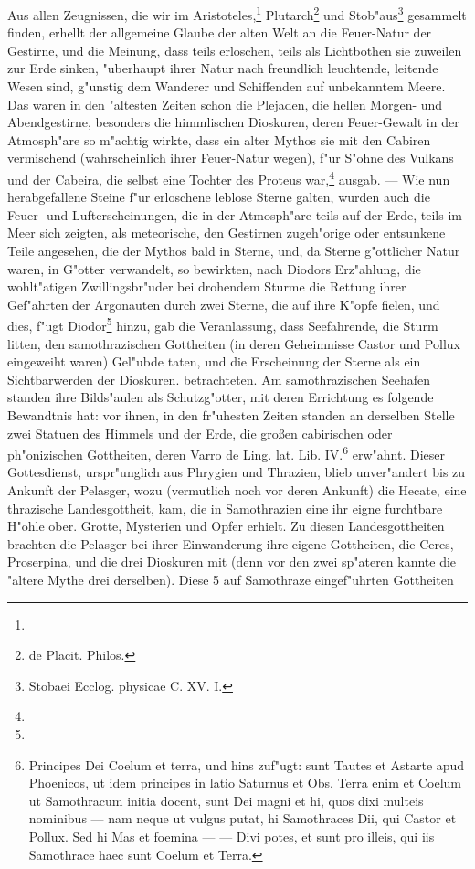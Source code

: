 \documentclass[a4paper, 11pt, oneside, polutonikogreek, german]{article}
\begin{document}
Aus allen Zeugnissen, die wir im Aristoteles,\footnote{} Plutarch\footnote{de Placit. Philos.} und Stob"aus\footnote{Stobaei Ecclog. physicae C. XV. I.} gesammelt finden, erhellt der allgemeine Glaube der alten Welt an die Feuer-Natur der Gestirne, und die Meinung, dass teils erloschen, teils als Lichtbothen sie zuweilen zur Erde sinken, "uberhaupt ihrer Natur nach freundlich leuchtende, leitende Wesen sind, g"unstig dem Wanderer und Schiffenden auf unbekanntem Meere. Das waren in den "altesten Zeiten schon die Plejaden, die hellen Morgen- und Abendgestirne, besonders die himmlischen Dioskuren, deren Feuer-Gewalt in der Atmosph"are so m"achtig wirkte, dass ein alter Mythos sie mit den Cabiren vermischend (wahrscheinlich ihrer Feuer-Natur wegen), f"ur S"ohne des Vulkans und der Cabeira, die selbst eine Tochter des Proteus war,\footnote{} ausgab. --- Wie nun herabgefallene Steine f"ur erloschene leblose Sterne galten, wurden auch die Feuer- und Lufterscheinungen, die in der Atmosph"are teils auf der Erde, teils im Meer sich zeigten, als meteorische, den Gestirnen zugeh"orige oder entsunkene Teile angesehen, die der Mythos bald in Sterne, und, da Sterne g"ottlicher Natur waren, in G"otter verwandelt, so bewirkten, nach Diodors Erz"ahlung, die wohlt"atigen Zwillingsbr"uder bei drohendem Sturme die Rettung ihrer Gef"ahrten der Argonauten durch zwei Sterne, die auf ihre K"opfe fielen, und dies, f"ugt Diodor\footnote{} hinzu, gab die Veranlassung, dass Seefahrende, die Sturm litten, den samothrazischen Gottheiten (in deren Geheimnisse Castor und Pollux eingeweiht waren) Gel"ubde taten, und die Erscheinung der Sterne als ein Sichtbarwerden der Dioskuren. betrachteten. Am samothrazischen Seehafen standen ihre Bilds"aulen als Schutzg"otter, mit deren Errichtung es folgende Bewandtnis hat: vor ihnen, in den fr"uhesten Zeiten standen an derselben Stelle zwei Statuen des Himmels und der Erde, die großen cabirischen oder ph"onizischen Gottheiten, deren Varro de Ling. lat. Lib. IV.\footnote{Principes Dei Coelum et terra, und hins zuf"ugt: sunt Tautes et Astarte apud Phoenicos, ut idem principes in latio Saturnus et Obs. Terra enim et Coelum ut Samothracum initia docent, sunt Dei magni et hi, quos dixi multeis nominibus --- nam neque ut vulgus putat, hi Samothraces Dii, qui Castor et Pollux. Sed hi Mas et foemina --- --- Divi potes, et sunt pro illeis, qui iis Samothrace haec sunt Coelum et Terra.} erw"ahnt. Dieser Gottesdienst, urspr"unglich aus Phrygien und Thrazien, blieb unver"andert bis zu Ankunft der Pelasger, wozu (vermutlich noch vor deren Ankunft) die Hecate, eine thrazische Landesgottheit, kam, die in Samothrazien eine ihr eigne furchtbare H"ohle ober. Grotte, Mysterien und Opfer erhielt. Zu diesen Landesgottheiten brachten die Pelasger bei ihrer Einwanderung ihre eigene Gottheiten, die Ceres, Proserpina, und die drei Dioskuren mit (denn vor den zwei sp"ateren kannte die "altere Mythe drei derselben). Diese 5 auf Samothraze eingef"uhrten Gottheiten 
\end{document}
